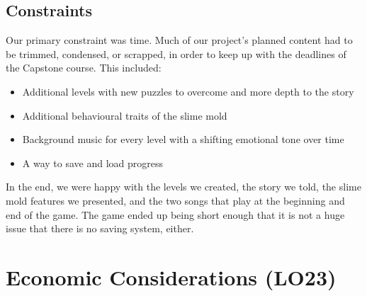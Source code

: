 \documentclass{article}
\begin{document}
\subsection{Constraints}

Our primary constraint was time. Much of our project's planned content had to be 
trimmed, condensed, or scrapped, in order to keep up with the deadlines of the 
Capstone course. This included:
\begin{itemize}
    \item Additional levels with new puzzles to overcome and more depth to the story
    \item Additional behavioural traits of the slime mold
    \item Background music for every level with a shifting emotional tone over time
    \item A way to save and load progress
\end{itemize}

In the end, we were happy with the levels we created, the story we told, the 
slime mold features we presented, and the two songs that play at the beginning 
and end of the game. The game ended up being short enough that it is not a huge 
issue that there is no saving system, either.

\section{Economic Considerations (LO23)}
\end{document}
